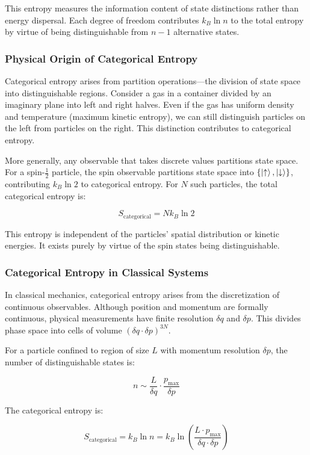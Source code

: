 \documentclass[twocolumn,10pt]{article}
\theoremstyle{definition}
\theoremstyle{remark}
\begin{document}
This entropy measures the information content of state distinctions rather than energy dispersal. Each degree of freedom contributes $k_B \ln n$ to the total entropy by virtue of being distinguishable from $n-1$ alternative states.

\subsubsection{Physical Origin of Categorical Entropy}

Categorical entropy arises from partition operations—the division of state space into distinguishable regions. Consider a gas in a container divided by an imaginary plane into left and right halves. Even if the gas has uniform density and temperature (maximum kinetic entropy), we can still distinguish particles on the left from particles on the right. This distinction contributes to categorical entropy.

More generally, any observable that takes discrete values partitions state space. For a spin-$\frac{1}{2}$ particle, the spin observable partitions state space into $\{ \ket{\uparrow}, \ket{\downarrow}\}$, contributing $k_B \ln 2$ to categorical entropy. For $N$ such particles, the total categorical entropy is:

$$
S_{\text{categorical}} = N k_B \ln 2
$$

This entropy is independent of the particles' spatial distribution or kinetic energies. It exists purely by virtue of the spin states being distinguishable.

\subsubsection{Categorical Entropy in Classical Systems}

In classical mechanics, categorical entropy arises from the discretization of continuous observables. Although position and momentum are formally continuous, physical measurements have finite resolution $\delta q$ and $\delta p$. This divides phase space into cells of volume $(\delta q \cdot \delta p)^{3N}$.

For a particle confined to region of size $L$ with momentum resolution $\delta p$, the number of distinguishable states is:

$$
n \sim \frac{L}{\delta q} \cdot \frac{p_{\text{max}}}{\delta p}
$$

The categorical entropy is:

$$
S_{\text{categorical}} = k_B \ln n = k_B \ln\left(\frac{L \cdot p_{\text{max}}}{\delta q \cdot \delta p}\right)
$$
\end{document}
